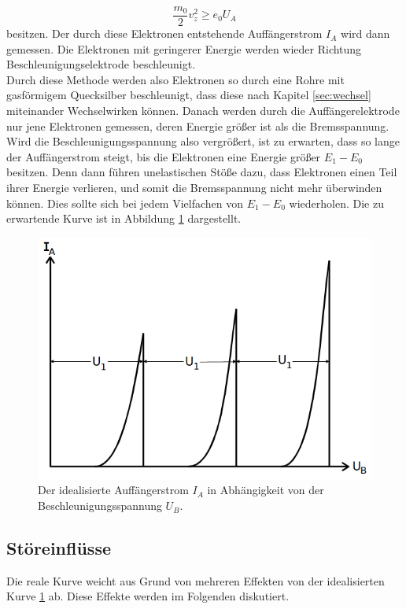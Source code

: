 \begin{equation}
    \frac{m_0}{2}v_z^2\geq e_0U_A  
    \label{eqn:vz} 
\end{equation}
besitzen. Der durch diese Elektronen entstehende Auffängerstrom $I_A$ wird dann gemessen. Die Elektronen mit geringerer Energie werden wieder 
Richtung Beschleunigungselektrode beschleunigt. \\
Durch diese Methode werden also Elektronen so durch eine Rohre mit gasförmigem Quecksilber beschleunigt, dass diese nach Kapitel 
\ref{sec:wechsel} miteinander Wechselwirken können. Danach werden durch die Auffängerelektrode nur jene Elektronen gemessen, deren Energie
größer ist als die Bremsspannung. Wird die Beschleunigungsspannung also vergrößert, ist zu erwarten, dass so lange der Auffängerstrom 
steigt, bis die Elektronen eine Energie größer $E_1-E_0$ besitzen. Denn dann führen unelastischen Stöße dazu, dass Elektronen einen Teil
ihrer Energie verlieren, und somit die Bremsspannung nicht mehr überwinden können. Dies sollte sich bei jedem Vielfachen von $E_1-E_0$ 
wiederholen. Die zu erwartende Kurve ist in Abbildung \ref{fig:fhk1} dargestellt. 
\begin{figure}[H]
    \centering
    \includegraphics[scale = 0.5]{pictures/Kurve1.png}
    \caption{Der idealisierte Auffängerstrom $I_A$ in Abhängigkeit von der Beschleunigungsspannung $U_B$. \cite{AP01}}
    \label{fig:fhk1}
\end{figure}

\subsection{Störeinflüsse}
\label{sec:stör}
Die reale Kurve weicht aus Grund von mehreren Effekten von der idealisierten Kurve \ref{fig:fhk1} ab. Diese Effekte werden im Folgenden 
diskutiert.


